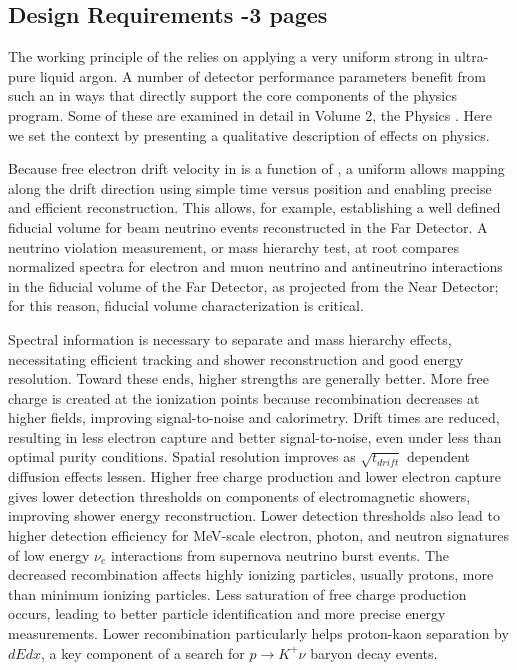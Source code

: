 
\subsection{Design Requirements -3 pages}
\label{sec:fddp-hv-des-consid}

The working principle of the  relies on applying a very uniform strong \efield in ultra-pure liquid argon.  A number of detector performance parameters benefit from such an \efield in ways that directly support the core components of the  physics program.  Some of these are examined in detail in Volume 2, the Physics .  Here we set the context by presenting a qualitative description of \efield effects on physics.

Because free electron drift velocity in  is a function of \efield, a uniform \efield allows mapping along the drift direction using simple time versus position and enabling precise and efficient \threed reconstruction.  This allows, for example, establishing a well defined fiducial volume for beam neutrino events reconstructed in the Far Detector.  A neutrino  violation measurement, or mass hierarchy test, at root compares normalized spectra for electron and muon neutrino and antineutrino interactions in the fiducial volume of the Far Detector, as projected from the Near Detector; for this reason, fiducial volume characterization is critical.   

Spectral information is necessary to separate  and mass hierarchy effects, necessitating efficient tracking and shower reconstruction and good energy resolution. Toward these ends, higher \efield strengths are generally better.  More free charge is created at the ionization points because recombination decreases at higher fields, improving signal-to-noise and calorimetry. Drift times are reduced, resulting in less electron capture and better signal-to-noise, even under less than optimal purity conditions.  Spatial resolution improves as $\sqrt{t_{drift}}$ dependent diffusion effects lessen. Higher free charge production and lower electron capture gives lower detection thresholds on components of electromagnetic showers, improving shower energy reconstruction.  Lower detection thresholds also lead to higher detection efficiency for MeV-scale electron, photon, and neutron signatures of low energy $\nu_e$ interactions from supernova neutrino burst events.  The decreased recombination affects highly ionizing particles, usually protons, more than minimum ionizing particles. Less saturation of free charge production occurs, leading to better particle identification and more precise energy measurements. Lower recombination particularly helps proton-kaon separation by $dEdx$, a key component of a search for $p\rightarrow K^+ \nu$ baryon decay events. 

